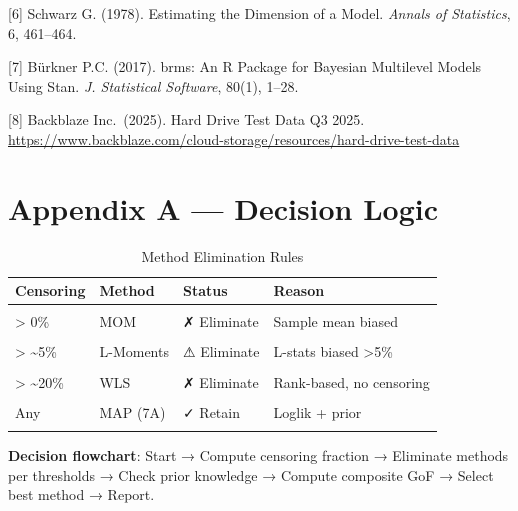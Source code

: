 \documentclass[
]{article}
\begin{document}
{[}6{]} Schwarz G. (1978). Estimating the Dimension of a Model.
\emph{Annals of Statistics}, 6, 461--464.

{[}7{]} Bürkner P.C. (2017). brms: An R Package for Bayesian Multilevel
Models Using Stan. \emph{J. Statistical Software}, 80(1), 1--28.

{[}8{]} Backblaze Inc.~(2025). Hard Drive Test Data Q3 2025.
\url{https://www.backblaze.com/cloud-storage/resources/hard-drive-test-data}

\newpage

\appendix

\section{Appendix A --- Decision Logic}\label{appendix-a-decision-logic}

\begin{longtable}[t]{llll}
\caption{\label{tab:appendix-a-decision}Method Elimination Rules}\\
\toprule
Censoring & Method & Status & Reason\\
\midrule
\cellcolor{gray!10}{> 0\%} & \cellcolor{gray!10}{Percentile} & \cellcolor{gray!10}{✗ Eliminate} & \cellcolor{gray!10}{Cannot place censored on CDF}\\
> 0\% & MOM & ✗ Eliminate & Sample mean biased\\
\cellcolor{gray!10}{> 0\%} & \cellcolor{gray!10}{EPF} & \cellcolor{gray!10}{✗ Eliminate} & \cellcolor{gray!10}{Cannot include censored in E[v³]}\\
> \textasciitilde{}5\% & L-Moments & ⚠ Eliminate & L-stats biased >5\%\\
\cellcolor{gray!10}{> \textasciitilde{}20\%} & \cellcolor{gray!10}{OLS} & \cellcolor{gray!10}{✗ Eliminate} & \cellcolor{gray!10}{Rank-based, no censoring}\\
\addlinespace
> \textasciitilde{}20\% & WLS & ✗ Eliminate & Rank-based, no censoring\\
\cellcolor{gray!10}{Any} & \cellcolor{gray!10}{MLE} & \cellcolor{gray!10}{✓ Retain} & \cellcolor{gray!10}{Censored loglik}\\
Any & MAP (7A) & ✓ Retain & Loglik + prior\\
\cellcolor{gray!10}{Any} & \cellcolor{gray!10}{MCMC (7B)} & \cellcolor{gray!10}{✓ Retain} & \cellcolor{gray!10}{Full posterior (extension)}\\
\bottomrule
\end{longtable}

\textbf{Decision flowchart}: Start → Compute censoring fraction →
Eliminate methods per thresholds → Check prior knowledge → Compute
composite GoF → Select best method → Report.
\end{document}

